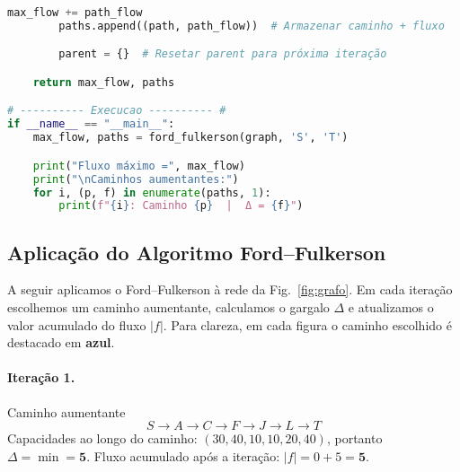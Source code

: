 \documentclass[12pt]{article}
\begin{document}
\begin{lstlisting}[language=Python, caption={}, label={lst:fordfulkerson}]
        max_flow += path_flow
        paths.append((path, path_flow))  # Armazenar caminho + fluxo

        parent = {}  # Resetar parent para próxima iteração

    return max_flow, paths

# ---------- Execucao ---------- #
if __name__ == "__main__":
    max_flow, paths = ford_fulkerson(graph, 'S', 'T')

    print("Fluxo máximo =", max_flow)
    print("\nCaminhos aumentantes:")
    for i, (p, f) in enumerate(paths, 1):
        print(f"{i}: Caminho {p}  |  Δ = {f}")
\end{lstlisting}



\newpage
\subsection{Aplicação do Algoritmo Ford--Fulkerson}

A seguir aplicamos o Ford--Fulkerson à rede da Fig.~\ref{fig:grafo}. Em cada iteração escolhemos um caminho aumentante, calculamos o gargalo \(\Delta\) e atualizamos o valor acumulado do fluxo \( |f|\). Para clareza, em cada figura o caminho escolhido é destacado em \textbf{azul}.





























\paragraph{Iteração 1.} Caminho aumentante
\[
S \to A \to C \to F \to J \to L \to T
\]
Capacidades ao longo do caminho: \((30,40,10,10,20,40)\), portanto \(\Delta = \min = \mathbf{5}\).
Fluxo acumulado após a iteração: \(|f|= 0+5 = \mathbf{5}\).
\end{document}
